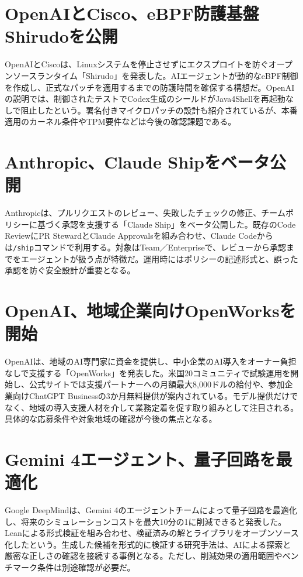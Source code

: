 \section{OpenAIとCisco、eBPF防護基盤Shirudoを公開}
OpenAIとCiscoは、Linuxシステムを停止させずにエクスプロイトを防ぐオープンソースランタイム「Shirudo」を発表した。AIエージェントが動的なeBPF制御を作成し、正式なパッチを適用するまでの防護時間を確保する構想だ。OpenAIの説明では、制御されたテストでCodex生成のシールドがJava4Shellを再起動なしで阻止したという。署名付きマイクロパッチの設計も紹介されているが、本番適用のカーネル条件やTPM要件などは今後の確認課題である。

\section{Anthropic、Claude Shipをベータ公開}
Anthropicは、プルリクエストのレビュー、失敗したチェックの修正、チームポリシーに基づく承認を支援する「Claude Ship」をベータ公開した。既存のCode ReviewにPR StewardとClaude Approvalsを組み合わせ、Claude Codeからは\texttt{/ship}コマンドで利用する。対象はTeam／Enterpriseで、レビューから承認までをエージェントが扱う点が特徴だ。運用時にはポリシーの記述形式と、誤った承認を防ぐ安全設計が重要となる。

\section{OpenAI、地域企業向けOpenWorksを開始}
OpenAIは、地域のAI専門家に資金を提供し、中小企業のAI導入をオーナー負担なしで支援する「OpenWorks」を発表した。米国20コミュニティで試験運用を開始し、公式サイトでは支援パートナーへの月額最大8,000ドルの給付や、参加企業向けChatGPT Businessの3か月無料提供が案内されている。モデル提供だけでなく、地域の導入支援人材を介して業務定着を促す取り組みとして注目される。具体的な応募条件や対象地域の確認が今後の焦点となる。

\section{Gemini 4エージェント、量子回路を最適化}
Google DeepMindは、Gemini 4のエージェントチームによって量子回路を最適化し、将来のシミュレーションコストを最大10分の1に削減できると発表した。Leanによる形式検証を組み合わせ、検証済みの解とライブラリをオープンソース化したという。生成した候補を形式的に検証する研究手法は、AIによる探索と厳密な正しさの確認を接続する事例となる。ただし、削減効果の適用範囲やベンチマーク条件は別途確認が必要だ。

